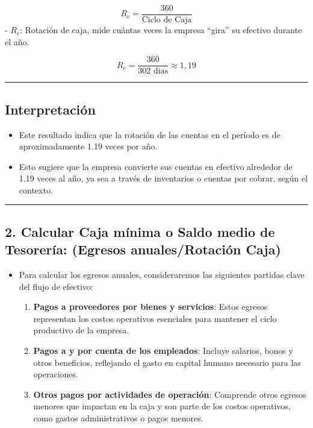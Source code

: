 \documentclass[
  letterpaper,
  DIV=11,
  numbers=noendperiod]{scrartcl}
\providecommand{\tightlist}{%
  \setlength{\itemsep}{0pt}\setlength{\parskip}{0pt}}\usepackage{longtable,booktabs,array}
\begin{document}
\[
   R_c = \frac{\text{360}}{\text{Ciclo de Caja}}
   \] - \(R_c\): Rotación de caja, mide cuántas veces la empresa
``gira'' su efectivo durante el año.

\[
   R_c = \frac{360}{\text{302 dias}}  \approx 1,19
   \]

\begin{center}\rule{0.5\linewidth}{0.5pt}\end{center}

\subsection{Interpretación}\label{interpretaciuxf3n}

\begin{itemize}
\item
  Este resultado indica que la rotación de las cuentas en el período es
  de aproximadamente 1.19 veces por año.
\item
  Esto sugiere que la empresa convierte sus cuentas en efectivo
  alrededor de 1.19 veces al año, ya sea a través de inventarios o
  cuentas por cobrar, según el contexto.
\end{itemize}

\begin{center}\rule{0.5\linewidth}{0.5pt}\end{center}

\subsection{2. Calcular Caja mínima o Saldo medio de Tesorería: (Egresos
anuales/Rotación
Caja)}\label{calcular-caja-muxednima-o-saldo-medio-de-tesoreruxeda-egresos-anualesrotaciuxf3n-caja}

\begin{itemize}
\tightlist
\item
  Para calcular los egresos anuales, consideraremos las siguientes
  partidas clave del flujo de efectivo:

  \begin{enumerate}
  \def\labelenumi{\arabic{enumi}.}
  \tightlist
  \item
    \textbf{Pagos a proveedores por bienes y servicios}: Estos egresos
    representan los costos operativos esenciales para mantener el ciclo
    productivo de la empresa.
  \item
    \textbf{Pagos a y por cuenta de los empleados}: Incluye salarios,
    bonos y otros beneficios, reflejando el gasto en capital humano
    necesario para las operaciones.
  \item
    \textbf{Otros pagos por actividades de operación}: Comprende otros
    egresos menores que impactan en la caja y son parte de los costos
    operativos, como gastos administrativos o pagos menores.
  \end{enumerate}
\end{itemize}
\end{document}
